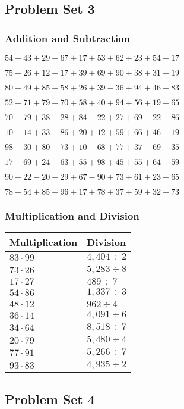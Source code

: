 \hypertarget{problem-set-3-1}{%
\subsection{Problem Set 3}\label{problem-set-3-1}}

\hypertarget{addition-and-subtraction-43}{%
\subsubsection{Addition and
Subtraction}\label{addition-and-subtraction-43}}

\(54+43+29+67+17+53+62+23+54+ 17\)

\(75+26+12+17+39+69+90+38+31+19\)

\(80-49+85-58+26+39-36+94+46+83\)

\(52+71+79+70+58+40+94+56+19+65\)

\(70+79+38+28+84-22+27+69-22-86\)

\(10+14+33+86+20+12+59+66+46+19\)

\(98+30+80+73+10-68+77+37-69-35\)

\(17+69+24+63+55+98+45+55+64+59\)

\(90+22-20+29+67-90+73+61+23-65\)

\(78+54+85+96+17+78+37+59+32+73\)

\hypertarget{multiplication-and-division-43}{%
\subsubsection{Multiplication and
Division}\label{multiplication-and-division-43}}

\begin{longtable}[]{@{}ll@{}}
\toprule
Multiplication & Division\tabularnewline
\midrule
\endhead
\(83\cdot99\) & \(4,404÷2\)\tabularnewline
\(73\cdot26\) & \(5,283÷8\)\tabularnewline
\(17\cdot27\) & \(489÷7\)\tabularnewline
\(54\cdot86\) & \(1,337÷3\)\tabularnewline
\(48\cdot12\) & \(962÷4\)\tabularnewline
\(36\cdot14\) & \(4,091÷6\)\tabularnewline
\(34\cdot64\) & \(8,518÷7\)\tabularnewline
\(20\cdot79\) & \(5,480÷4\)\tabularnewline
\(77\cdot91\) & \(5,266÷7\)\tabularnewline
\(93\cdot83\) & \(4,935÷2\)\tabularnewline
\bottomrule
\end{longtable}

\hypertarget{problem-set-4-1}{%
\subsection{Problem Set 4}\label{problem-set-4-1}}


